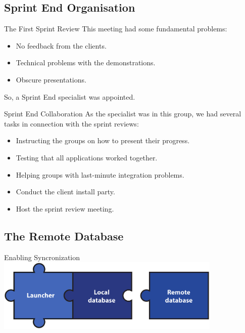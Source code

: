 \subsection{Sprint End Organisation}

\begin{frame}{The First Sprint Review}
	This meeting had some fundamental problems:
	\begin{itemize}
		\item No feedback from the clients.
		\item Technical problems with the demonstrations.
		\item Obscure presentations.
	\end{itemize}
	\vspace{\baselineskip}
	So, a Sprint End specialist was appointed.
\end{frame}

\begin{frame}{Sprint End Collaboration}
	As the specialist was in this group, we had several tasks in connection with the sprint reviews:
	\begin{itemize}
		\item<1> Instructing the groups on how to present their progress.
		\item<2> Testing that all applications worked together.
		\item<3> Helping groups with last-minute integration problems.
		\item<4> Conduct the client install party.
		\item<5> Host the sprint review meeting.
	\end{itemize}
\end{frame}


\subsection{The Remote Database}

\begin{frame}{Enabling Syncronization}
	\includegraphics[height=3.5cm]{images/giraf-puzzle}
\end{frame}

